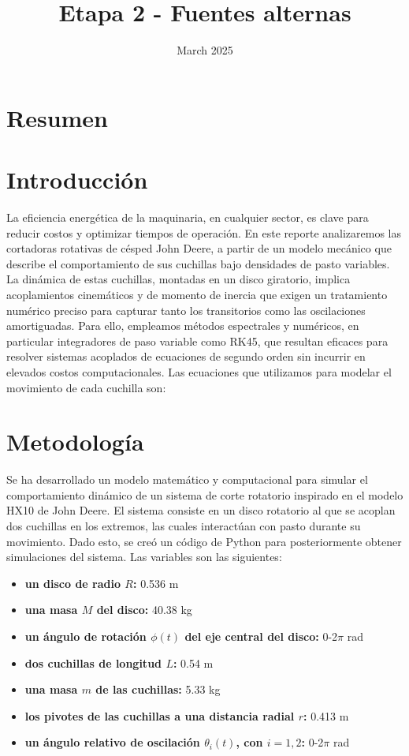 \documentclass[12pt]{article}
\title{Etapa 2 - Fuentes alternas}
\date{March 2025}
\begin{document}
\maketitle

\section{Resumen}

\section{Introducción}
La eficiencia energética de la maquinaria, en cualquier sector, es clave para reducir costos y optimizar tiempos de operación. En este reporte analizaremos las cortadoras rotativas de césped John Deere, a partir de un modelo mecánico que describe el comportamiento de sus cuchillas bajo densidades de pasto variables. La dinámica de estas cuchillas, montadas en un disco giratorio, implica acoplamientos cinemáticos y de momento de inercia que exigen un tratamiento numérico preciso para capturar tanto los transitorios como las oscilaciones amortiguadas. Para ello, empleamos métodos espectrales y numéricos, en particular integradores de paso variable como RK45, que resultan eficaces para resolver sistemas acoplados de ecuaciones de segundo orden sin incurrir en elevados costos computacionales. Las ecuaciones que utilizamos para modelar el movimiento de cada cuchilla son:

\section{Metodología}

Se ha desarrollado un modelo matemático y computacional para simular el comportamiento dinámico de un sistema de corte rotatorio inspirado en el modelo HX10 de John Deere. El sistema consiste en un disco rotatorio al que se acoplan dos cuchillas en los extremos, las cuales interactúan con pasto durante su movimiento. Dado esto, se creó un código de Python para posteriormente obtener simulaciones del sistema. Las variables son las siguientes: 

\begin{itemize}
    \item \textbf{un disco de radio $R$:} 0.536 m
    \item \textbf{una masa $M$ del disco:} 40.38 kg  
    \item \textbf{un ángulo de rotación $\phi(t)$ del eje central del disco:} 0-2$\pi$ rad
    \item \textbf{dos cuchillas de longitud $L$:} 0.54 m
    \item \textbf{una masa $m$ de las cuchillas:} 5.33 kg
    \item \textbf{los pivotes de las cuchillas a una distancia radial $r$:} 0.413 m
    \item \textbf{un ángulo relativo de oscilación $\theta_i(t)$, con $i = 1, 2$:} 0-2$\pi$ rad
\end{itemize}
\end{document}
